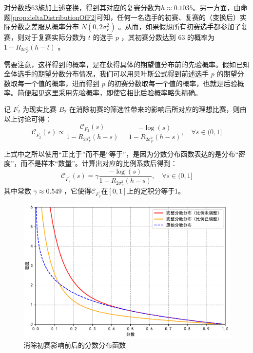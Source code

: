             对分数线63施加上述变换，得到其对应的复赛分数为$h\approx 0.1035$。另一方面，由命题\ref{prop:deltaDistributionOfF2}可知，任何一名选手的初赛、复赛的（变换后）实际分数之差服从概率分布 $N(0,2\sigma_F^2)$ 。从而，如果假想所有初赛选手都参加了复赛，则对于复赛实际分数为 $t$ 的选手 $p$ ，其初赛分数达到 63 的概率为 $1-R_{2\sigma_F^2}(h-t)$ 。
            
            需要注意，这样得到的概率，是在获得具体的期望值分布前的先验概率。假如已知全体选手的期望分数分布情况，我们可以用贝叶斯公式得到前述选手 $p$ 的期望分数取每一个值的概率，进而得到 $p$ 的初赛分数取每一个值的概率，也就是后验概率。简便起见这里采用先验概率，即使它相比后验概率略失精确。

            记 $F_2^\prime$ 为现实比赛 $B_2$ 在消除初赛的筛选性带来的影响后所对应的理想比赛，则由以上讨论可得：
            $$
            \mathcal{C}_{F_2^\prime}(s)\propto\frac{\mathcal{C}_{F_2}(s)}{1-R_{2\sigma_F^2}(h-s)}=\frac{-\log(s)}{1-R_{2\sigma_F^2}(h-s)},\quad\forall s\in (0,1]
            $$

            上式中之所以使用“正比于”而不是“等于”，是因为分数分布函数表达的是分布“密度”，而不是样本“数量”。计算出对应的比例系数后得到：
            $$
            \mathcal{C}_{F_2^\prime}(s)=\gamma\frac{-\log(s)}{1-R_{2\sigma_F^2}(h-s)},\quad\forall s\in (0,1]
            $$
            其中常数 $\gamma\approx0.549$ ，它使得$\mathcal{C}_{F_2^\prime}$在$[0,1]$上的定积分等于1。

            \begin{figure}
                \centering
                \includegraphics[width=\textwidth]{fig/plottingNewNoipScores.pdf}
                \caption{消除初赛影响前后的分数分布函数}
                \label{fig:curvesBeforeAndAfterCountering}
            \end{figure}

